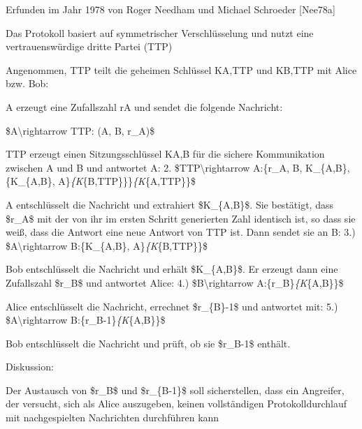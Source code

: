 \documentclass[a4paper]{article}
\begin{document}
\begin{multicols}{3}
      \begin{itemize*}
            \item Erfunden im Jahr 1978 von Roger Needham und Michael Schroeder
            {[}Nee78a{]}
            \item Das Protokoll basiert auf symmetrischer Verschlüsselung und nutzt eine
            vertrauenswürdige dritte Partei (TTP)
            \item Angenommen, TTP teilt die geheimen Schlüssel KA,TTP und KB,TTP mit
            Alice bzw. Bob:
            \begin{itemize*}
                  \item A erzeugt eine Zufallszahl rA und sendet die folgende Nachricht:
                  \begin{enumerate*} \def\labelenumi{\arabic{enumi}.} \item \$A\textbackslash rightarrow TTP: (A, B, r\_A)\$ \end{enumerate*}
                  \item TTP erzeugt einen Sitzungsschlüssel KA,B für die sichere Kommunikation zwischen A und B und antwortet A: 2. \$TTP\textbackslash rightarrow A:\{r\_A, B, K\_\{A,B\}, \{K\_\{A,B\}, A\}\emph{\{K}\{B,TTP\}\}\}\emph{\{K}\{A,TTP\}\}\$
                  \item A entschlüsselt die Nachricht und extrahiert \$K\_\{A,B\}\$. Sie bestätigt, dass \$r\_A\$ mit der von ihr im ersten Schritt generierten Zahl identisch ist, so dass sie weiß, dass die Antwort eine neue Antwort von TTP ist. Dann sendet sie an B: 3.) \$A\textbackslash rightarrow B:\{K\_\{A,B\}, A\}\emph{\{K}\{B,TTP\}\}\$
                  \item Bob entschlüsselt die Nachricht und erhält \$K\_\{A,B\}\$. Er erzeugt dann eine Zufallszahl \$r\_B\$ und antwortet Alice: 4.) \$B\textbackslash rightarrow A:\{r\_B\}\emph{\{K}\{A,B\}\}\$
                  \item Alice entschlüsselt die Nachricht, errechnet \$r\_\{B\}-1\$ und antwortet mit: 5.) \$A\textbackslash rightarrow B:\{r\_B-1\}\emph{\{K}\{A,B\}\}\$
                  \item Bob entschlüsselt die Nachricht und prüft, ob sie \$r\_B-1\$ enthält.
            \end{itemize*}
            \item Diskussion:
            \begin{itemize*}
                  \item Der Austausch von \$r\_B\$ und \$r\_\{B-1\}\$ soll sicherstellen, dass ein Angreifer, der versucht, sich als Alice auszugeben, keinen vollständigen Protokolldurchlauf mit nachgespielten Nachrichten durchführen kann

\end{itemize*}
\end{itemize*}
\end{multicols}
\end{document}
